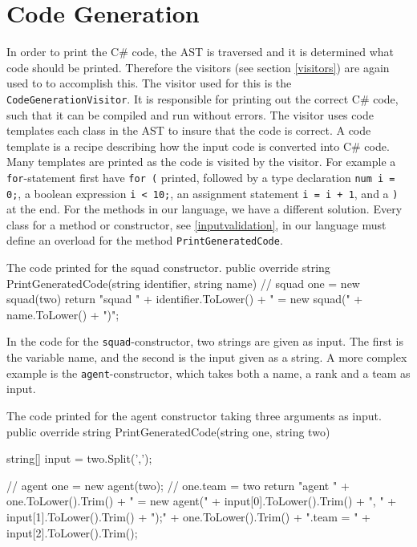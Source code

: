 \section{Code Generation}
In order to print the C\# code, the AST is traversed and it is determined what code should be printed. 
Therefore the visitors (see section \ref{visitors}) are again used to to accomplish this.
The visitor used for this is the \texttt{CodeGenerationVisitor}. It is responsible for printing out the correct C\# code, such that it can be compiled and run without errors. 
The visitor uses code templates each class in the AST to insure that the code is correct. \newline
A code template is a recipe describing how the input code is converted into C\# code. 
Many templates are printed as the code is visited by the visitor. 
For example a \texttt{for}-statement first have \texttt{for (} printed, followed by a type declaration \texttt{num i = 0;}, a boolean expression \texttt{i < 10;}, an assignment statement \texttt{i = i + 1}, and a \texttt{)} at the end.\newline
For the methods in our language, we have a different solution. 
Every class for a method or constructor, see \ref{inputvalidation}, in our language must define an overload for the method \texttt{PrintGeneratedCode}. 

\begin{source}{The code printed for the squad constructor.}{}
public override string PrintGeneratedCode(string identifier, string name)
        {
            // squad one = new squad(two)
            return "squad " + identifier.ToLower() + " = new squad(" + name.ToLower() + ")";
        }
\end{source}

In the code for the \texttt{squad}-constructor, two strings are given as input. 
The first is the variable name, and the second is the input given as a string. 
A more complex example is the \texttt{agent}-constructor, which takes both a name, a rank and a team as input.

\begin{source}{The code printed for the agent constructor taking three arguments as input.}{}
public override string PrintGeneratedCode(string one, string two)
        {
            string[] input = two.Split(',');
						
            // agent one = new agent(two);
            // one.team = two
            return "agent " + one.ToLower().Trim() + 
							" = new agent(" + input[0].ToLower().Trim() + 
							", " + input[1].ToLower().Trim() + ");\n" + 
							one.ToLower().Trim() + ".team = " + 
							input[2].ToLower().Trim();
        }
\end{source}

